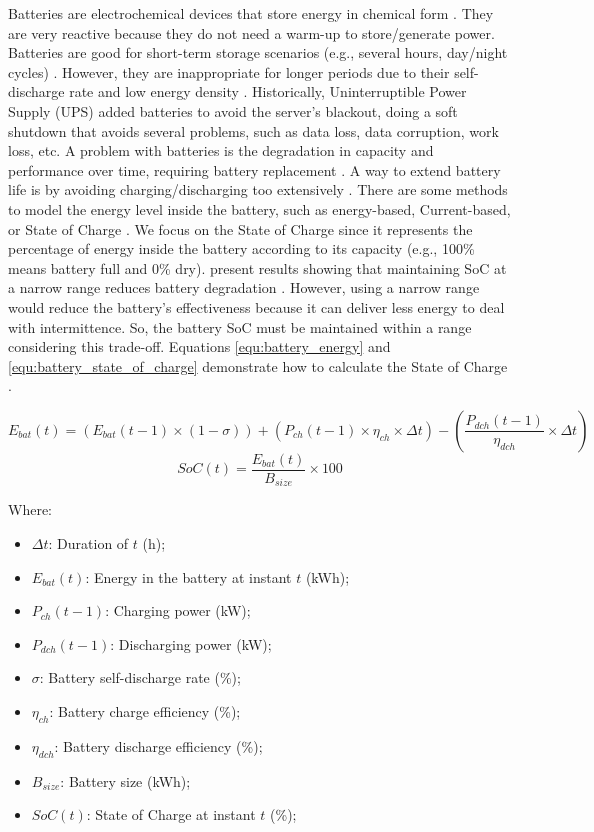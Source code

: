 Batteries are electrochemical devices that store energy in chemical form \cite{rostirolla2022survey, yilanci2009review, wang2012energy}. They are very reactive because they do not need a warm-up to store/generate power. Batteries are good for short-term storage scenarios (e.g., several hours, day/night cycles) \cite{rostirolla2022survey}. However, they are inappropriate for longer periods due to their self-discharge rate and low energy density \cite{rostirolla2022survey, yilanci2009review}. Historically, Uninterruptible Power Supply (UPS) added batteries to avoid the server's blackout, doing a soft shutdown that avoids several problems, such as data loss, data corruption, work loss, etc. A problem with batteries is the degradation in capacity and performance over time, requiring battery replacement \cite{rostirolla2022survey}. A way to extend battery life is by avoiding charging/discharging too extensively \cite{xu2016modeling}. There are some methods to model the energy level inside the battery, such as energy-based, Current-based, or State of Charge \cite{rostirolla2022survey}. We focus on the State of Charge since it represents the percentage of energy inside the battery according to its capacity (e.g., 100\% means battery full and 0\% dry). \citeauthor{xu2016modeling} present results showing that maintaining SoC at a narrow range reduces battery degradation \cite{xu2016modeling}. However, using a narrow range would reduce the battery's effectiveness because it can deliver less energy to deal with intermittence. So, the battery SoC must be maintained within a range considering this trade-off. Equations \ref{equ:battery_energy} and \ref{equ:battery_state_of_charge} demonstrate how to calculate the State of Charge \cite{haddad2019mixed}. 

\begin{equation}
    \label{equ:battery_energy}
    E_{bat}(t) = (E_{bat}(t-1) \times (1 - \sigma)) + (P_{ch}(t-1) \times \eta_{ch} \times \Delta t) - (\frac{P_{dch}(t-1)}{\eta_{dch}} \times \Delta t)
\end{equation}
\begin{equation}
    \label{equ:battery_state_of_charge}
    SoC(t) = \frac{E_{bat}(t)}{B_{size}} \times 100
\end{equation}

Where:
\begin{itemize}
    \item $\Delta t$: Duration of $t$ (h);
    \item $E_{bat}(t)$: Energy in the battery at instant $t$ (kWh);
    \item $P_{ch}(t-1)$: Charging power (kW);
    \item $P_{dch}(t-1)$: Discharging power (kW);
    \item $\sigma$: Battery self-discharge rate (\%);
    \item $\eta_{ch}$: Battery charge efficiency (\%);
    \item $\eta_{dch}$: Battery discharge efficiency (\%);
    \item $B_{size}$: Battery size (kWh);
    \item $SoC(t)$: State of Charge at instant $t$ (\%);
\end{itemize}

